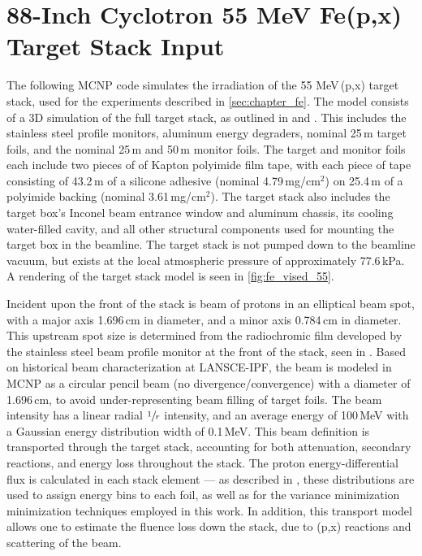 



\section{88-Inch Cyclotron 55 MeV Fe(p,x) Target Stack Input} \label{sec:88_mcnp_deck}



The following MCNP code simulates the irradiation of the 55 MeV\,(p,x) target stack, used for the experiments described in  \autoref{sec:chapter_fe}.
The model consists of a 3D simulation of the full target stack, as outlined in  and  .
This includes the stainless steel profile monitors, aluminum energy degraders, nominal 25\,\mmicro m  target foils, and the nominal 25\,\mmicro m   and 50\,\mmicro m  monitor foils.
The target and monitor foils each include two pieces of of Kapton polyimide film tape, with each piece of  tape consisting of 43.2\,\mmicro m of a silicone adhesive (nominal 4.79\,mg/cm$^2$) on 25.4\,\mmicro m of a polyimide backing (nominal 3.61\,mg/cm$^2$).
The target stack also includes the target box's Inconel beam entrance window and aluminum chassis, its cooling water-filled cavity, and all other structural components used for mounting the target box in the beamline.
The target stack is not pumped down to the beamline vacuum, but exists at the local atmospheric pressure of approximately 77.6\,kPa.
A rendering of the target stack model  is seen in \autoref{fig:fe_vised_55}.



Incident upon the front of the stack is  beam of protons in an elliptical beam spot, with a major axis 1.696\,cm in diameter, and a minor axis 0.784\,cm in diameter.  
This upstream spot size is determined from the radiochromic film developed by the  stainless steel beam profile monitor at the front of the stack, seen in .
Based on historical beam characterization at LANSCE-IPF, the beam is modeled in MCNP as a circular pencil beam (no divergence/convergence) with a diameter of 1.696\,cm, to avoid under-representing beam filling of target foils.
The beam intensity has a linear radial $\sfrac{1}{r}$ intensity, and an average energy of 100\,MeV  with a Gaussian energy distribution width of 0.1\,MeV.
This beam definition is transported through the target stack, accounting for both attenuation, secondary reactions, and energy loss throughout the stack.
The proton energy-differential flux is calculated in each stack element --- as described in ,  these distributions are used to assign energy bins  to each foil, as well as for the variance minimization minimization techniques employed in this work.
In addition, this transport model allows one to estimate the fluence loss down the stack, due to (p,x) reactions and scattering of the beam.


